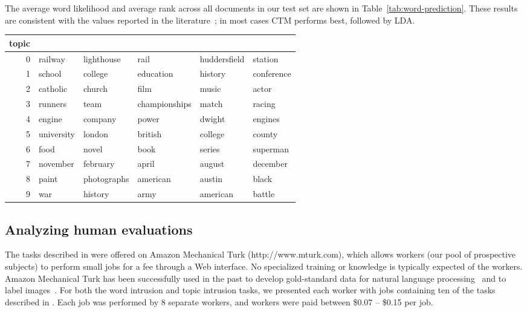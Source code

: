 The average word likelihood and average rank across all documents in
our test set are shown in Table~\ref{tab:word-prediction}.  These
results are consistent with the values reported in the
literature~\cite{blei-03,blei-06}; in most cases CTM performs best,
followed by LDA.

\begin{table*}
  \caption{Two predictive metrics: predictive log likelihood/predictive rank.  Consistent with values reported in the literature, CTM generally performs the best, followed by LDA, then pLSI.  The bold numbers indicate the best performance in each row.}
\label{tab:word-prediction}
\centering
\footnotesize
\begin{tabular}{rlllll}
  topic & & & & & \\
  \hline
  0 & railway & lighthouse & rail & huddersfield & station \\ 
  1 & school & college & education & history & conference \\ 
  2 & catholic & church & film & music & actor \\ 
  3 & runners & team & championships & match & racing \\ 
  4 & engine & company & power & dwight & engines \\ 
  5 & university & london & british & college & county \\ 
  6 & food & novel & book & series & superman \\ 
  7 & november & february & april & august & december \\ 
  8 & paint & photographs & american & austin & black \\ 
  9 & war & history & army & american & battle \\ 
   \hline
\end{tabular}
\vspace{0.2in}
\end{table*}

\subsection{Analyzing human evaluations}

The tasks described in  were offered on Amazon
Mechanical Turk (http://www.mturk.com), which allows workers (our pool
of prospective subjects) to perform small jobs for a fee through a Web
interface.  No specialized training or knowledge is typically expected
of the workers.  Amazon Mechanical Turk has been successfully used in
the past to develop gold-standard data for natural language
processing~\cite{snow-08} and to label images~\cite{imagenet-cvpr09}.
For both the word intrusion and topic intrusion tasks, we presented
each worker with jobs containing ten of the tasks described in
.  Each job was performed by 8 separate workers, and
workers were paid between \$0.07 -- \$0.15 per job.

